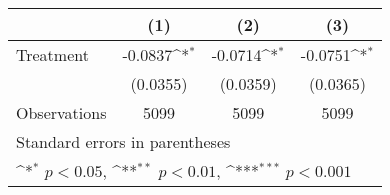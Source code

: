 {
\def\sym#1{\ifmmode^{#1}\else\(^{#1}\)\fi}
\begin{tabular}{l*{3}{c}}
\hline\hline
                    &\multicolumn{1}{c}{(1)}         &\multicolumn{1}{c}{(2)}         &\multicolumn{1}{c}{(3)}         \\
\hline
Treatment           &     -0.0837\sym{*}  &     -0.0714\sym{*}  &     -0.0751\sym{*}  \\
                    &    (0.0355)         &    (0.0359)         &    (0.0365)         \\
\hline
Observations        &        5099         &        5099         &        5099         \\
\hline\hline
\multicolumn{4}{l}{\footnotesize Standard errors in parentheses}\\
\multicolumn{4}{l}{\footnotesize \sym{*} \(p<0.05\), \sym{**} \(p<0.01\), \sym{***} \(p<0.001\)}\\
\end{tabular}
}
